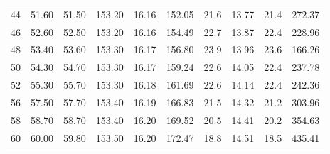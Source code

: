 \begin{table}[H]
\begin{adjustbox}{width=1.2\textwidth, center}
\begin{tabular}{S S[table-format=3.2] S[table-format=3.2] S[table-format=3.2] S[table-format=2.2] S[table-format=3.2] S[table-format=2.1] S[table-format=2.2] S[table-format=3.2] S[table-format=4.2]}
			44                 & 51.60               & 51.50               & 153.20                   & 16.16            & 152.05             & 21.6                             & 13.77                                & 21.4                             & 272.37                      \\
			46                 & 52.60               & 52.50               & 153.20                   & 16.16            & 154.49             & 22.7                             & 13.87                                & 22.4                             & 228.96                      \\
			48                 & 53.40               & 53.60               & 153.30                   & 16.17            & 156.80             & 23.9                             & 13.96                                & 23.6                             & 166.26                      \\
			50                 & 54.30               & 54.70               & 153.30                   & 16.17            & 159.24             & 22.6                             & 14.05                                & 22.4                             & 237.78                      \\
			52                 & 55.30               & 55.70               & 153.30                   & 16.18            & 161.69             & 22.6                             & 14.14                                & 22.4                             & 242.36                      \\
			56                 & 57.50               & 57.70               & 153.40                   & 16.19            & 166.83             & 21.5                             & 14.32                                & 21.2                             & 303.96                      \\
			58                 & 58.70               & 58.70               & 153.40                   & 16.20            & 169.52             & 20.5                             & 14.41                                & 20.2                             & 354.63                      \\
			60                 & 60.00               & 59.80               & 153.50                   & 16.20            & 172.47             & 18.8                             & 14.51                                & 18.5                             & 435.41                      \\

\end{tabular}
\end{adjustbox}
\end{table}
